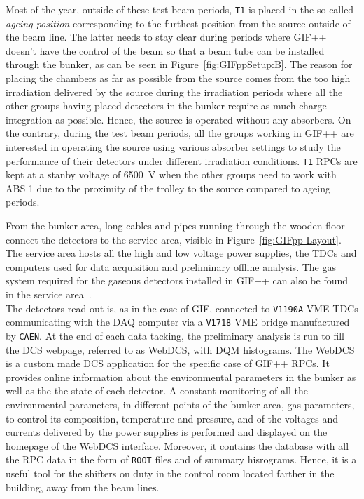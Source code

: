 	Most of the year, outside of these test beam periods, \texttt{T1} is placed in the so called \textit{ageing position} corresponding to the furthest position from the source outside of the beam line. The latter needs to stay clear during periods where GIF++ doesn't have the control of the beam so that a beam tube can be installed through the bunker, as can be seen in Figure~\ref{fig:GIFppSetup:B}. The reason for placing the chambers as far as possible from the source comes from the too high irradiation delivered by the source during the irradiation periods where all the other groups having placed detectors in the bunker require as much charge integration as possible. Hence, the source is operated without any absorbers. On the contrary, during the test beam periods, all the groups working in GIF++ are interested in operating the source using various absorber settings to study the performance of their detectors under different irradiation conditions. \texttt{T1} RPCs are kept at a stanby voltage of \SI{6500}{V} when the other groups need to work with ABS 1 due to the proximity of the trolley to the source compared to ageing periods.
	
	From the bunker area, long cables and pipes running through the wooden floor connect the detectors to the service area, visible in Figure~\ref{fig:GIFpp-Layout}. The service area hosts all the high and low voltage power supplies, the TDCs and computers used for data acquisition and preliminary offline analysis. The gas system required for the gaseous detectors installed in GIF++ can also be found in the service area~\cite{WEBDCS}.\\
	The detectors read-out is, as in the case of GIF, connected to \texttt{V1190A} VME TDCs communicating with the DAQ computer via a \texttt{V1718} VME bridge manufactured by \texttt{CAEN}. At the end of each data tacking, the preliminary analysis is run to fill the \acl{DCS} webpage, referred to as WebDCS, with \acf{DQM} histograms. The WebDCS is a custom made DCS application for the specific case of GIF++ RPCs. It provides online information about the environmental parameters in the bunker as well as the the state of each detector. A constant monitoring of all the environmental parameters, in different points of the bunker area, gas parameters, to control its composition, temperature and pressure, and of the voltages and currents delivered by the power supplies is performed and displayed on the homepage of the WebDCS interface. Moreover, it contains the database with all the RPC data in the form of \texttt{ROOT} files and of summary hisrograms. Hence, it is a useful tool for the shifters on duty in the control room located farther in the building, away from the beam lines.

